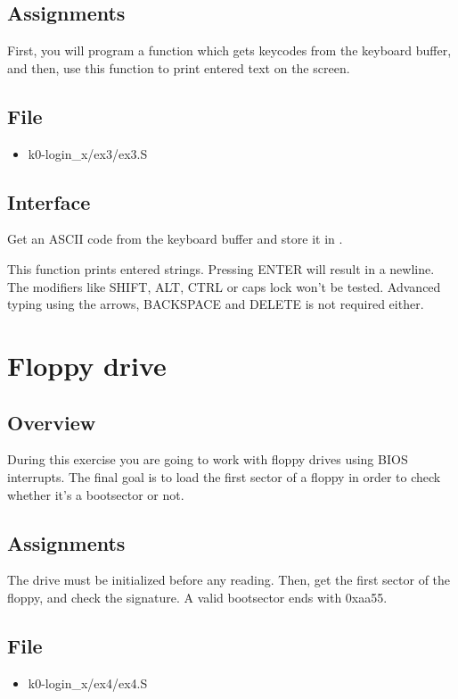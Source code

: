 \subsection*{Assignments}
First, you will program a function which gets keycodes from the keyboard
buffer, and then, use this function to print entered text on the screen.

\subsection*{File}
\begin{itemize}
  \item k0-login\_x/ex3/ex3.S
\end{itemize}

\subsection*{Interface}
{
  Get an ASCII code from the keyboard buffer and store it in .
}

{
  This function prints entered strings. Pressing ENTER will result in a
  newline.
  The modifiers like SHIFT, ALT, CTRL or caps lock won't be tested. Advanced
  typing using the arrows, BACKSPACE and DELETE is not required either.
}

%
%

\newpage

\section{Floppy drive}

\subsection*{Overview}
During this exercise you are going to work with floppy drives using BIOS
interrupts. The final goal is to load the first sector of a floppy in order
to check whether it's a bootsector or not.

\subsection*{Assignments}
The drive must be initialized before any reading. Then, get the first sector of
the floppy, and check the signature. A valid bootsector ends with 0xaa55.

\subsection*{File}
\begin{itemize}
  \item k0-login\_x/ex4/ex4.S
\end{itemize}

